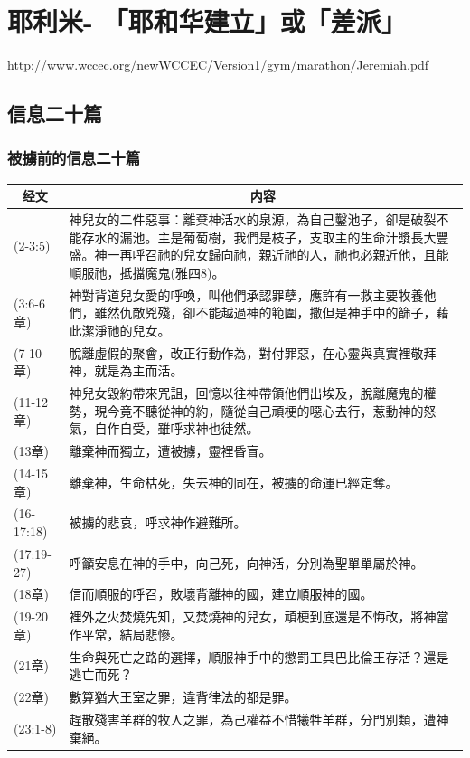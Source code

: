 \section{耶利米- 「耶和华建立」或「差派」}
http://www.wccec.org/newWCCEC/Version1/gym/marathon/Jeremiah.pdf
\subsection{信息二十篇}
\subsubsection{被擄前的信息二十篇}
\begin{table}[H]
\centering
\begin{tabular}{p{}|p{15.50cm}}\hline\hline
\multicolumn{1}{c|}{经文}&\multicolumn{1}{c}{内容}\\\hline
(2-3:5)&神兒女的二件惡事：離棄神活水的泉源，為自己鑿池子，卻是破裂不能存水的漏池。主是葡萄樹，我們是枝子，支取主的生命汁漿長大豐盛。神一再呼召祂的兒女歸向祂，親近祂的人，祂也必親近他，且能順服祂，抵擋魔鬼(雅四8)。
\\\hline
(3:6-6章)&神對背道兒女愛的呼喚，叫他們承認罪孽，應許有一救主要牧養他們，雖然仇敵兇殘，卻不能越過神的範圍，撒但是神手中的篩子，藉此潔淨祂的兒女。\\\hline 
 (7-10章)&脫離虛假的聚會，改正行動作為，對付罪惡，在心靈與真實裡敬拜神，就是為主而活。\\\hline
 (11-12章)&神兒女毀約帶來咒詛，回憶以往神帶領他們出埃及，脫離魔鬼的權勢，現今竟不聽從神的約，隨從自己頑梗的噁心去行，惹動神的怒氣，自作自受，雖呼求神也徒然。\\\hline
 (13章)&離棄神而獨立，遭被擄，靈裡昏盲。\\\hline
 (14-15章)&離棄神，生命枯死，失去神的同在，被擄的命運已經定奪。\\\hline
 (16-17:18)&被擄的悲哀，呼求神作避難所。\\\hline
 (17:19-27)&呼籲安息在神的手中，向己死，向神活，分別為聖單單屬於神。\\\hline
 (18章)&信而順服的呼召，敗壞背離神的國，建立順服神的國。\\\hline
 (19-20章)&裡外之火焚燒先知，又焚燒神的兒女，頑梗到底還是不悔改，將神當作平常，結局悲慘。\\\hline 
 (21章)&生命與死亡之路的選擇，順服神手中的懲罰工具巴比倫王存活？還是逃亡而死？\\\hline
 (22章)&數算猶大王室之罪，違背律法的都是罪。\\\hline
 (23:1-8)&趕散殘害羊群的牧人之罪，為己權益不惜犧牲羊群，分門別類，遭神棄絕。\\\hline

\end{tabular}
\end{table}
